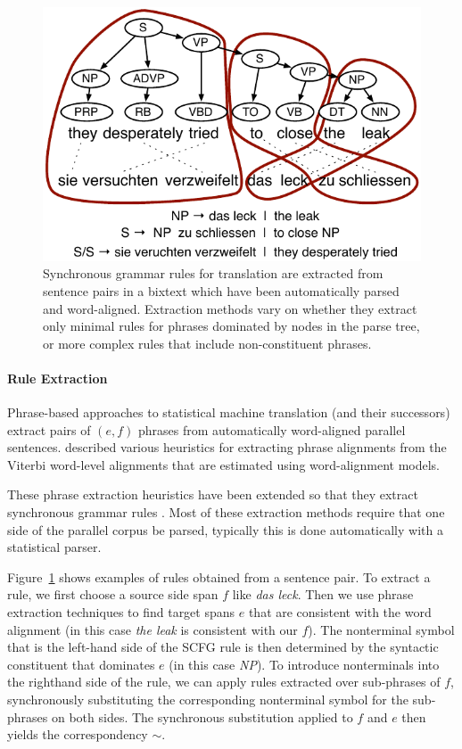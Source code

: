 \documentclass[11pt]{article}
\begin{document}
\begin{figure}[t]
\begin{center}
\includegraphics[width=0.9\linewidth]{figures/example_extraction-2.pdf}
\end{center}
\caption{Synchronous grammar rules for translation are extracted from
  sentence pairs in a bixtext which have been automatically parsed and
  word-aligned. Extraction methods vary on whether they extract only
  minimal rules for phrases dominated by nodes in the parse tree, or
  more complex rules that include non-constituent phrases.}
\label{example_extraction}
\end{figure}

\paragraph{Rule Extraction}

Phrase-based approaches to statistical machine translation (and their
successors) extract pairs of $(e, f)$ phrases from automatically
word-aligned parallel sentences. 
described various heuristics for extracting phrase alignments from the
Viterbi word-level alignments that are estimated using
 word-alignment models.

These phrase extraction heuristics have been extended so that they
extract synchronous grammar rules
\cite{Galley2004,Chiang2005,Zollmann2006,Liu2006}.  Most of these
extraction methods require that one side of the parallel corpus be
parsed, typically this is done automatically with a statistical
parser.

Figure~\ref{example_extraction} shows examples of rules obtained from
a sentence pair. To extract a rule, we first choose a source side span
$f$ like {\it das leck}.  Then we use phrase extraction techniques to
find target spans $e$ that are consistent with the word alignment (in
this case {\it the leak} is consistent with our $f$). The nonterminal
symbol that is the left-hand side of the SCFG rule is then determined
by the syntactic constituent that dominates $e$ (in this case {\it
  NP}). To introduce nonterminals into the righthand side of the rule,
we can apply rules extracted over sub-phrases of $f$, synchronously
substituting the corresponding nonterminal symbol for the sub-phrases
on both sides. The synchronous substitution applied to $f$ and $e$
then yields the correspondency $\sim$.
\end{document}
